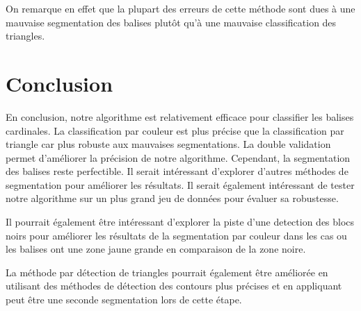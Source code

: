 \documentclass{article}
\begin{document}
On remarque en effet que la plupart des erreurs de cette méthode sont dues à
une mauvaise segmentation des balises plutôt qu'à une mauvaise classification
des triangles.

\section{Conclusion}

En conclusion, notre algorithme est relativement efficace pour classifier les
balises cardinales. La classification par couleur est plus précise que la
classification par triangle car plus robuste aux mauvaises segmentations. La
double validation permet d'améliorer la précision de notre algorithme.
Cependant, la segmentation des balises reste perfectible. Il serait intéressant
d'explorer d'autres méthodes de segmentation pour améliorer les résultats. Il
serait également intéressant de tester notre algorithme sur un plus grand jeu
de données pour évaluer sa robustesse.

Il pourrait également être intéressant d'explorer la piste d'une detection des
blocs noirs pour améliorer les résultats de la segmentation par couleur dans
les cas ou les balises ont une zone jaune grande en comparaison de la zone
noire.

La méthode par détection de triangles pourrait également être améliorée en
utilisant des méthodes de détection des contours plus précises et en appliquant
peut être une seconde segmentation lors de cette étape.
\end{document}
